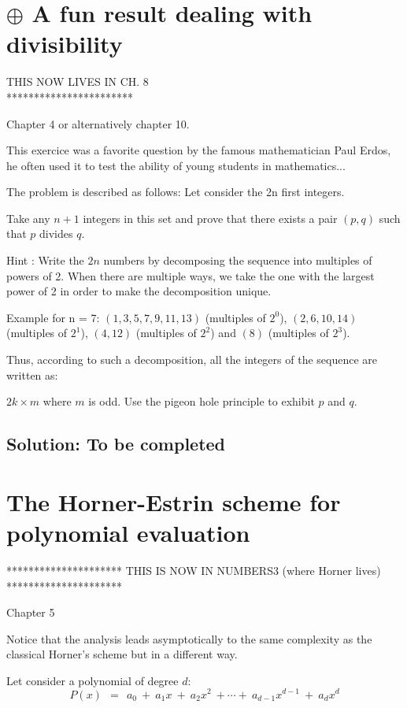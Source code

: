 \documentclass{article}[12pt]
\begin{document}
\section{$\oplus$ A fun result dealing with divisibility}

THIS NOW LIVES IN CH. 8 \\
***********************

Chapter 4 or alternatively chapter 10.

This exercice was a favorite question by the famous mathematician Paul Erdos, 
he often used it to test the ability of young students in mathematics...

The problem is described as follows: Let consider the 2n first integers.

Take any $n+1$ integers in this set and prove that there exists a pair $(p,q)$ such that $p$ divides $q$.
\smallskip

Hint : Write the $2n$ numbers by decomposing the sequence into multiples of powers of 2. 
When there are multiple ways, we take the one with the largest power of 2 in order to make the decomposition unique. 

Example for n = 7:
$(1, 3, 5, 7, 9, 11, 13)$ (multiples of $2^0$), 
$(2, 6, 10, 14)$ (multiples of $2^1$),
$(4, 12)$ (multiples of $2^2$) and $(8)$ (multiples of $2^3$).

Thus, according to such a decomposition, all the integers of the sequence are written as: 

$2k \times m$ where $m$ is odd.
Use the pigeon hole principle to exhibit $p$ and $q$.

\subsection{Solution: To be completed}


\section{The Horner-Estrin scheme for polynomial evaluation}

*********************
THIS IS NOW IN NUMBERS3 (where Horner lives)
*********************


Chapter 5

Notice that the analysis leads asymptotically to the same complexity as the classical Horner's scheme but in a different way.
\bigskip

Let consider a polynomial of degree $d$:
\[
P(x) \ \ = \ \ a_0 \ + \ a_1 x \ + \ a_2 x^2 \ + \cdots + \ a_{d-1} x^{d-1} \ + \ a_d x^d
\]
\end{document}
